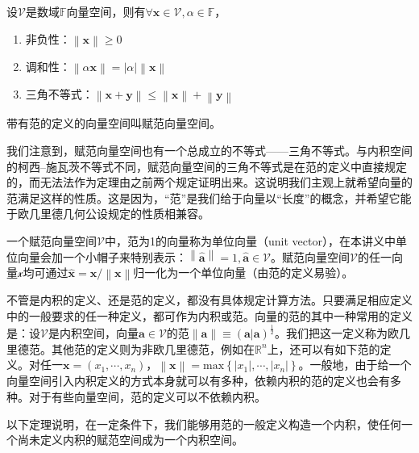 \documentclass[main.tex]{subfiles}
\begin{document}
\begin{definition}[向量的范]\label{def:II.3.2}
设$\mathcal{V}$是数域$\mathbb{F}$向量空间，则有$\forall\mathbf{x}\in\mathcal{V},\alpha\in\mathbb{F}$，
\begin{enumerate}
    \item 非负性：$\left\|\mathbf{x}\right\|\geq 0$
    \item 调和性：$\left\|\alpha\mathbf{x}\right\|=\left|\alpha\right|\left\|\mathbf{x}\right\|$
    \item 三角不等式：$\left\|\mathbf{x}+\mathbf{y}\right\|\leq\left\|\mathbf{x}\right\|+\left\|\mathbf{y}\right\|$
\end{enumerate}
带有范的定义的向量空间叫赋范向量空间。
\end{definition}

我们注意到，赋范向量空间也有一个总成立的不等式——三角不等式。与内积空间的柯西--施瓦茨不等式不同，赋范向量空间的三角不等式是在范的定义中直接规定的，而无法法作为定理由之前两个规定证明出来。这说明我们主观上就希望向量的范满足这样的性质。这是因为，“范”是我们给于向量以“长度”的概念，并希望它能于欧几里德几何公设规定的性质相兼容。

一个赋范向量空间$\mathcal{V}$中，范为1的向量称为单位向量（unit vector），在本讲义中单位向量会加一个小帽子来特别表示：$\left\|\hat{\mathbf{a}}\right\|=1,\hat{\mathbf{a}}\in\mathcal{V}$。赋范向量空间$\mathcal{V}$的任一向量$\mathcal{x}$均可通过$\hat{\mathbf{x}}=\mathbf{x}/\left\|\mathbf{x}\right\|$归一化为一个单位向量（由范的定义易验）。

不管是内积的定义、还是范的定义，都没有具体规定计算方法。只要满足相应定义中的一般要求的任一种定义，都可作为内积或范。向量的范的其中一种常用的定义是：设$\mathcal{V}$是内积空间，向量$\mathbf{a}\in\mathcal{V}$的范$\left\|\mathbf{a}\right\|\equiv\left(\mathbf{a}|\mathbf{a}\right)^{\frac{1}{2}}$。我们把这一定义称为欧几里德范。其他范的定义则为非欧几里德范，例如在$\mathbb{R}^n$上，还可以有如下范的定义。对任一$\mathbf{x}=\left(x_1,\cdots,x_n\right)$，$\left\|\mathbf{x}\right\|=\mathrm{max}\left\{\left|x_1\right|,\cdots,\left|x_n\right|\right\}$。一般地，由于给一个向量空间引入内积定义的方式本身就可以有多种，依赖内积的范的定义也会有多种。对于有些向量空间，范的定义可以不依赖内积。

以下定理说明，在一定条件下，我们能够用范的一般定义构造一个内积，使任何一个尚未定义内积的赋范空间成为一个内积空间。
\end{document}
